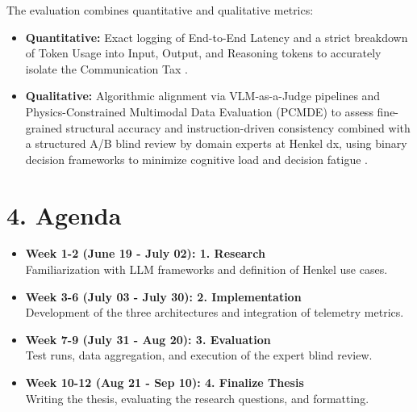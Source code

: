 \documentclass[12pt,a4paper]{article}
\begin{document}
The evaluation combines quantitative and qualitative metrics:
\begin{itemize}
    \item \textbf{Quantitative:} Exact logging of End-to-End Latency and a strict breakdown of Token Usage into Input, Output, and Reasoning tokens to accurately isolate the Communication Tax \cite{salim2026}.
    \item \textbf{Qualitative:} Algorithmic alignment via VLM-as-a-Judge pipelines \cite{ku2024} and Physics-Constrained Multimodal Data Evaluation (PCMDE) \cite{gupta2025} to assess fine-grained structural accuracy and instruction-driven consistency combined with a structured A/B blind review by domain experts at Henkel dx, using binary decision frameworks to minimize cognitive load and decision fatigue \cite{hitl_survey_2026}.
\end{itemize}

\section*{4. Agenda}
\begin{itemize}
    \item \textbf{Week 1-2 (June 19 - July 02): 1. Research} \\
    Familiarization with LLM frameworks and definition of Henkel use cases.
    \item \textbf{Week 3-6 (July 03 - July 30): 2. Implementation} \\
    Development of the three architectures and integration of telemetry metrics.
    \item \textbf{Week 7-9 (July 31 - Aug 20): 3. Evaluation} \\
    Test runs, data aggregation, and execution of the expert blind review.
    \item \textbf{Week 10-12 (Aug 21 - Sep 10): 4. Finalize Thesis} \\
    Writing the thesis, evaluating the research questions, and formatting.
\end{itemize}

\appendix
\end{document}
